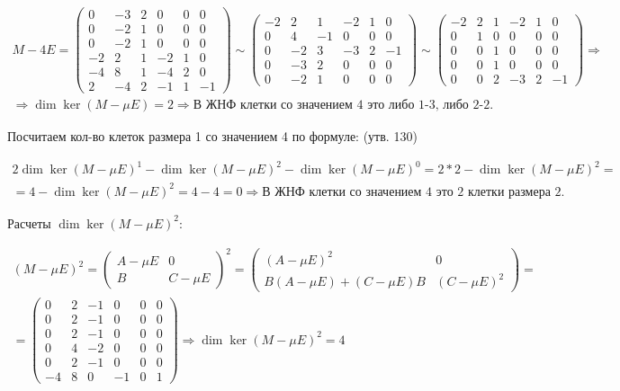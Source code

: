 \documentclass[11pt]{article}
\begin{document}
$$
\begin{gathered}
M - 4E =
\begin{pmatrix}
0 & -3 & 2 & 0 & 0 & 0 \\
0 & -2 & 1 & 0 & 0 & 0 \\
0 & -2 & 1 & 0 & 0 & 0 \\
-2 & 2 & 1 & -2 & 1 & 0 \\
-4 & 8 & 1 & -4 & 2 & 0 \\
2 & -4 & 2 & -1 & 1 & -1
\end{pmatrix} \sim
\begin{pmatrix}
-2 & 2 & 1 & -2 & 1 & 0 \\
0 & 4 & -1 & 0 & 0 & 0 \\
0 & -2 & 3 & -3 & 2 & -1 \\
0 & -3 & 2 & 0 & 0 & 0 \\
0 & -2 & 1 & 0 & 0 & 0
\end{pmatrix} \sim
\begin{pmatrix}
-2 & 2 & 1 & -2 & 1 & 0 \\
0 & 1 & 0 & 0 & 0 & 0 \\
0 & 0 & 1 & 0 & 0 & 0 \\
0 & 0 & 1 & 0 & 0 & 0 \\
0 & 0 & 2 & -3 & 2 & -1
\end{pmatrix} \Rightarrow \\[6pt] \Rightarrow \dim \ker(M - \mu E) = 2 \Rightarrow \text{В ЖНФ клетки со значением 4 это либо 1-3, либо 2-2}.
\end{gathered}
$$

Посчитаем кол-во клеток размера 1 со значением 4 по формуле: (утв. 130)

$$
\begin{gathered}
2 \dim \ker(M - \mu E)^1 - \dim \ker(M - \mu E)^2 - \dim \ker(M - \mu E)^0 = 2 * 2 - \dim \ker(M - \mu E)^2 = \\ = 4 - \dim \ker(M - \mu E)^2 = 4 - 4 = 0 \Rightarrow \text{В ЖНФ клетки со значением 4 это 2 клетки размера 2}.
\end{gathered}
$$

Расчеты $\dim \ker(M - \mu E)^2$:

$$
\begin{gathered}
(M - \mu E)^2 =
\begin{pmatrix}
A - \mu E & 0 \\
B & C - \mu E
\end{pmatrix}^2 =
\begin{pmatrix}
(A - \mu E)^2 & 0 \\
B(A - \mu E) + (C - \mu E)B & (C - \mu E)^2
\end{pmatrix} = \\[6pt] =
\begin{pmatrix}
0 & 2 & -1 & 0 & 0 & 0 \\
0 & 2 & -1 & 0 & 0 & 0 \\
0 & 2 & -1 & 0 & 0 & 0 \\
0 & 4 & -2 & 0 & 0 & 0 \\
0 & 2 & -1 & 0 & 0 & 0 \\
-4 & 8 & 0 & -1 & 0 & 1
\end{pmatrix} \Rightarrow \dim \ker(M - \mu E)^2 = 4
\end{gathered}
$$
\end{document}
